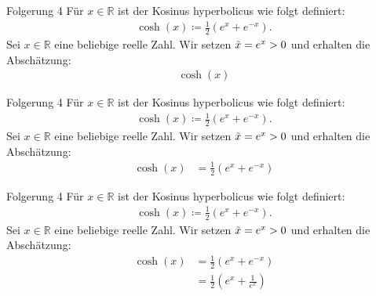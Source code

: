 \documentclass[10pt]{beamer}
\def\bR{\mathbb{R}}
\begin{document}
\begin{frame}{Folgerung 4}
    Für \( x \in \bR \) ist der Kosinus hyperbolicus wie folgt definiert:
    \begin{align*}
        \cosh\left( x \right)
        \coloneq \frac{1}{2} \left( e^{x} + e^{-x} \right).
    \end{align*}
    Sei \( x \in \bR \) eine beliebige reelle Zahl. Wir setzen \( \Tilde{x} = e^{x} > 0 \) und erhalten die Abschätzung:
    \begin{align*}
        \cosh\left( x \right)
    \end{align*}
\end{frame}



\begin{frame}{Folgerung 4}
    Für \( x \in \bR \) ist der Kosinus hyperbolicus wie folgt definiert:
    \begin{align*}
        \cosh\left( x \right)
        \coloneq \frac{1}{2} \left( e^{x} + e^{-x} \right).
    \end{align*}
    Sei \( x \in \bR \) eine beliebige reelle Zahl. Wir setzen \( \Tilde{x} = e^{x} > 0 \) und erhalten die Abschätzung:
    \begin{align*}
        \cosh\left( x \right)
        & = \frac{1}{2} \left( e^{x} + e^{-x} \right)
    \end{align*}
\end{frame}



\begin{frame}{Folgerung 4}
    Für \( x \in \bR \) ist der Kosinus hyperbolicus wie folgt definiert:
    \begin{align*}
        \cosh\left( x \right)
        \coloneq \frac{1}{2} \left( e^{x} + e^{-x} \right).
    \end{align*}
    Sei \( x \in \bR \) eine beliebige reelle Zahl. Wir setzen \( \Tilde{x} = e^{x} > 0 \) und erhalten die Abschätzung:
    \begin{align*}
        \cosh\left( x \right)
        & = \frac{1}{2} \left( e^{x} + e^{-x} \right) \\
        & = \frac{1}{2} \left( e^{x} + \frac{1}{e^{x}} \right)
    \end{align*}
\end{frame}
\end{document}

